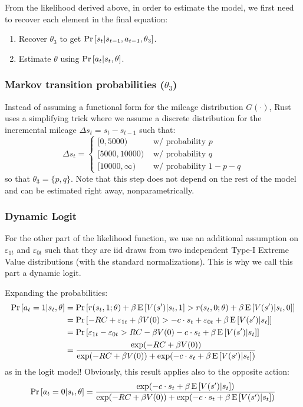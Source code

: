 From the likelihood derived above, in order to estimate the model, we first need to recover each element in the final equation:\begin{enumerate}
\item Recover $\theta_3$ to get $\operatorname{Pr}\left[s_t | s_{t-1}, a_{t-1}, \theta_3\right]$.
\item Estimate $\theta$ using $\operatorname{Pr}\left[a_t| s_t, \theta\right]$.
\end{enumerate}

\subsubsection{Markov transition probabilities ($\theta_3$)}

Instead of assuming a functional form for the mileage distribution $G(\cdot)$, Rust uses a simplifying trick where we assume a discrete distribution for the incremental mileage $\Delta s_t = s_t - s_{t-1}$ such that: $$ \Delta s_t = \begin{cases} [0, 5000) & \text{ w/ probability } p \\
[5000, 10000) & \text{ w/ probability } q \\
[10000, \infty) & \text{ w/ probability } 1 - p -q
\end{cases} $$
so that $\theta_3 = \{p, q\}$. Note that this step does not depend on the rest of the model and can be estimated right away, nonparametrically.

\subsubsection{Dynamic Logit}

For the other part of the likelihood function, we use an additional assumption on $\varepsilon_{1t}$ and $\varepsilon_{0t}$ such that they are iid draws from two independent Type-I Extreme Value distributions (with the standard normalizations). This is why we call this part a dynamic logit.

Expanding the probabilities:
\begin{align*}
\operatorname{Pr}\left[a_t = 1 | s_t, \theta\right] & = \operatorname{Pr}\left[r(s_t, 1; \theta) + \beta \operatorname{E}\left[ V(s') | s_t, 1 \right] > r(s_t, 0; \theta) + \beta \operatorname{E}\left[ V(s') | s_t, 0 \right]\right] \\
& =  \operatorname{Pr}\left[- RC + \varepsilon_{1t} + \beta  V(0)  > - c\cdot s_t + \varepsilon_{0t} + \beta \operatorname{E}\left[ V(s') | s_t \right]\right] \\
& =  \operatorname{Pr}\left[\varepsilon_{1t} - \varepsilon_{0t} > RC  - \beta  V(0) - c\cdot s_t  + \beta \operatorname{E}\left[ V(s') | s_t \right]\right] \\
& = \frac{\exp(- RC + \beta  V(0) ) }{\exp(- RC + \beta  V(0) ) + \exp( - c\cdot s_t + \beta \operatorname{E}\left[ V(s') | s_t \right])}
\end{align*}
as in the logit model! Obviously, this result applies also to the opposite action: 
\begin{align*}
\operatorname{Pr}\left[a_t = 0 | s_t, \theta\right] = \frac{\exp( - c\cdot s_t + \beta \operatorname{E}\left[ V(s') | s_t \right]) }{\exp(- RC + \beta  V(0) ) + \exp( - c\cdot s_t + \beta \operatorname{E}\left[ V(s') | s_t \right])}
\end{align*}

